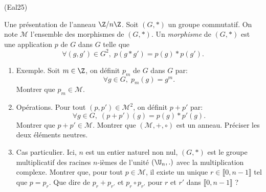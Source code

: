 \begin{tiny}(Eal25)\end{tiny} Une présentation de l'anneau $\Z/n\Z$.\newline
Soit $(G,*)$ un groupe commutatif. On note $\mathcal{M}$ l'ensemble des morphismes de $(G,*)$. Un \emph{morphisme} de $(G,*)$ est une application $p$ de $G$ dans $G$ telle que 
\[
 \forall (g,g')\in G^2, \; p(g*g') = p(g)*p(g').
\]
\begin{enumerate}
 \item Exemple. Soit $m\in \Z$, on définit $p_m$ de $G$ dans $G$ par:
 \[
  \forall g\in G,\; p_m(g) = g^m.
 \]
Montrer que $p_m \in \mathcal{M}$.

 \item Opérations.\newline
 Pour tout $(p,p')\in \mathcal{M}^2$, on définit $p+p'$ par:
\[
 \forall g \in G, \; (p+p')(g) = p(g)*p'(g).
\]
Montrer que $p+p'\in \mathcal{M}$. Montrer que $(\mathcal{M}, +, \circ)$ est un anneau. Préciser les deux éléments neutres.

 \item Cas particulier.\newline
 Ici, $n$ est un entier naturel non nul, $(G,*)$ est le groupe multiplicatif des racines $n$-ièmes de l'unité $(\U_n,.)$ avec la multiplication complexe.\newline
 Montrer que, pour tout $p\in \mathcal{M}$, il existe un unique $r\in \llbracket 0, n-1\rrbracket$ tel que $p=p_r$.\newline
 Que dire de $p_r + p_{r'}$ et $p_r \circ p_{r'}$ pour $r$ et $r'$ dans $\llbracket 0, n-1\rrbracket$ ?
\end{enumerate}
